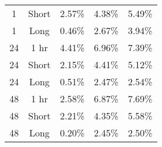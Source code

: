 \begin{table}[H]
\begin{tabular}{ccccc}
1                           & Short             & 2.57\%        & 4.38\%        & 5.49\%        \\
1                           & Long              & 0.46\%        & 2.67\%        & 3.94\%        \\ \hline
24                          & 1 hr              & 4.41\%        & 6.96\%        & 7.39\%        \\
24                          & Short             & 2.15\%        & 4.41\%        & 5.12\%        \\
24                          & Long              & 0.51\%        & 2.47\%        & 2.54\%        \\ \hline
48                          & 1 hr              & 2.58\%        & 6.87\%        & 7.69\%        \\
48                          & Short             & 2.21\%        & 4.35\%        & 5.58\%        \\
48                          & Long              & 0.20\%        & 2.45\%        & 2.50\%  \\ \hline
   
\end{tabular}
\end{table}